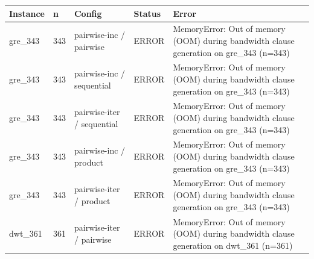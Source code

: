 \begin{tabular}{lllll}
\hline
Instance & n & Config & Status & Error \\
\hline
gre\_343 & 343 & pairwise-inc / pairwise & ERROR & MemoryError: Out of memory (OOM) during bandwidth clause generation on gre\_343 (n=343) \\
gre\_343 & 343 & pairwise-inc / sequential & ERROR & MemoryError: Out of memory (OOM) during bandwidth clause generation on gre\_343 (n=343) \\
gre\_343 & 343 & pairwise-iter / sequential & ERROR & MemoryError: Out of memory (OOM) during bandwidth clause generation on gre\_343 (n=343) \\
gre\_343 & 343 & pairwise-inc / product & ERROR & MemoryError: Out of memory (OOM) during bandwidth clause generation on gre\_343 (n=343) \\
gre\_343 & 343 & pairwise-iter / product & ERROR & MemoryError: Out of memory (OOM) during bandwidth clause generation on gre\_343 (n=343) \\
dwt\_361 & 361 & pairwise-iter / pairwise & ERROR & MemoryError: Out of memory (OOM) during bandwidth clause generation on dwt\_361 (n=361) \\
\hline
\end{tabular}
